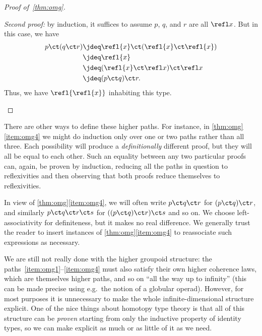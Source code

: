 \begin{proof}[Proof of~\cref{thm:omg}]
\begin{enumerate}
    \mentalpause

    \noindent \emph{Second proof:} by induction, it suffices to assume $p$, $q$, and $r$ are all $\refl x$.
    But in this case, we have
    \begin{align*}
      p\ct (q\ct r)
      &\jdeq \refl{x}\ct(\refl{x}\ct \refl{x})\\
      &\jdeq \refl{x}\\
      &\jdeq (\refl{x}\ct \refl x)\ct \refl x\\
      &\jdeq (p\ct q)\ct r.
    \end{align*}
    Thus, we have $\refl{\refl{x}}$ inhabiting this type. \qedhere
  \end{enumerate}
\end{proof}

\begin{rmk}
  There are other ways to define these higher paths.
  For instance, in \cref{thm:omg}\ref{item:omg4} we might do induction only over one or two paths rather than all three.
  Each possibility will produce a \emph{definitionally} different proof, but they will all be equal to each other.
  Such an equality between any two particular proofs can, again, be proven by induction, reducing all the paths in question to reflexivities and then observing that both proofs reduce themselves to reflexivities.
\end{rmk}

In view of \cref{thm:omg}\ref{item:omg4}, we will often write $p\ct q\ct r$ for $(p\ct q)\ct r$, and similarly $p\ct q\ct r \ct s$ for $((p\ct q)\ct r)\ct s$ and so on.
We choose left-associativity for definiteness, but it makes no real difference.
We generally trust the reader to insert instances of \cref{thm:omg}\ref{item:omg4} to reassociate such expressions as necessary.

We are still not really done with the higher groupoid structure: the paths~\ref{item:omg1}--\ref{item:omg4} must also satisfy their own higher coherence laws, which are themselves higher paths,
%
%
%
%
and so on ``all the way up to infinity'' (this can be made precise using e.g.\ the notion of a globular operad).
However, for most purposes it is unnecessary to make the whole infinite-dimensional structure explicit.
One of the nice things about homotopy type theory is that all of this structure can be \emph{proven} starting from only the inductive property of identity types, so we can make explicit as much or as little of it as we need.

